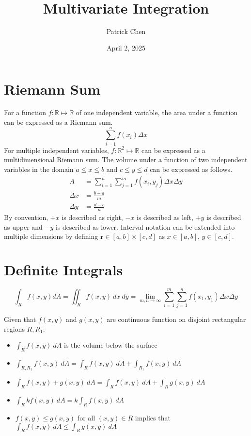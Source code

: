 \documentclass{article}
\title{Multivariate Integration}
\author{Patrick Chen}
\date{April 2, 2025}
\theoremstyle{mytheoremstyle}
\theoremstyle{mytheoremstyle}
\theoremstyle{myproblemstyle}
\begin{document}
    \maketitle
    \section*{Riemann Sum}
    For a function $f: \mathbb{R} \mapsto \mathbb{R}$ of one independent
    variable,  the area under a function  can be expressed as a Riemann sum.
    \[
        \sum_{i=1}^{n} f(x_i)\Delta x
    \]
    For multiple independent variables, $f: \mathbb{R}^2 \mapsto \mathbb{R}$ can
    be expressed as a multidimensional Riemann sum. The volume under a function
    of two independent variables in the domain $a\le x\le b$ and $c\le y\le d$
    can be expressed as follows.
    \begin{align*}
        A &= \sum_{i=1}^{n} \sum_{j=1}^{m} f(x_i,y_j) \Delta x \Delta y \\
        \Delta x &= \frac{b-a}{m} \\
        \Delta y &= \frac{d-c}{n}
    \end{align*}
    By convention, $+x$ is described as right, $-x$ is described as left, $+y$
    is described as upper and $-y$ is described as lower. Interval notation can
    be extended into multiple dimensions by defining $\mathbf{r}\in[a,b]\times[c,d]$ as
    $x\in[a,b]$, $y\in[c,d]$.

    \section*{Definite Integrals}
    \[
        \int_R f(x,y) dA = \iint_R f(x,y)\ dx\ dy = \lim_{m,n\to
        \infty}\sum_{i=1}^{m} \sum_{j=1}^{n} f(x_1,y_1)\Delta x \Delta y
    \]

    Given that $f(x,y)$ and $g(x,y)$ are continuous function on disjoint
    rectangular regions $R,R_1$:
    \begin{itemize}
        \item $\int_R f(x,y)\ dA$ is the volume below the surface
        \item $\int_{R,R_1} f(x,y)\ dA = \int_R f(x,y)\ dA + \int_{R_1} f(x,y)\ dA$
        \item $\int_R f(x,y) + g(x,y)\ dA = \int_R f(x,y)\ dA + \int_R g(x,y)\ dA$
        \item $\int_R kf(x,y)\ dA = k \int_R f(x,y)\ dA$
        \item $f(x,y) \le g(x,y)$ for all $(x,y)\in R$ implies that
            $\int_R f(x,y)\ dA \le \int_R g(x,y)\ dA$
    \end{itemize}
\end{document}
